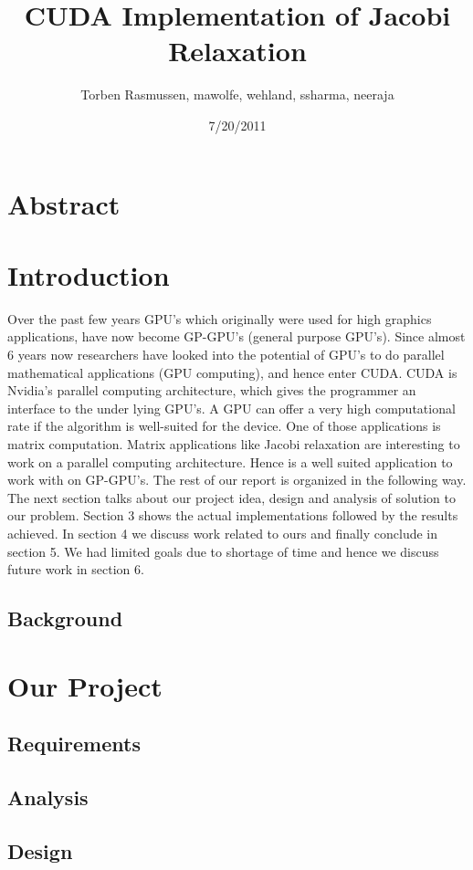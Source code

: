 \documentclass[11pt, twocolumn]{article}
\title{CUDA Implementation of Jacobi Relaxation}
\author{Torben Rasmussen, mawolfe, wehland, ssharma, neeraja}
\date{7/20/2011}
\begin{document}
\maketitle
\section{Abstract}
\section{Introduction} %
Over the past few years GPU’s which originally were used for high graphics applications, have now become GP-GPU’s (general purpose GPU’s).
Since almost 6 years now researchers have looked into the potential of GPU’s to do parallel mathematical applications (GPU computing), and hence enter CUDA.
CUDA is Nvidia’s parallel computing architecture, which gives the programmer an interface to the under lying GPU’s.
A GPU can offer a very high computational rate if the algorithm is well-suited for the device.
One of those applications is matrix computation.
Matrix applications like Jacobi relaxation are interesting to work on a parallel computing architecture.
Hence is a well suited application to work with on GP-GPU’s.
The rest of our report is organized in the following way.
The next section talks about our project idea, design and analysis of solution to our problem.
Section 3 shows the actual implementations followed by the results achieved.
In section 4 we discuss work related to ours and finally conclude in section 5.
We had limited goals due to shortage of time and hence we discuss future work in section 6.
    \subsection{Background} %

\section{Our Project}
    \subsection{Requirements} %
    \subsection{Analysis} %
    \subsection{Design} %
\end{document}
